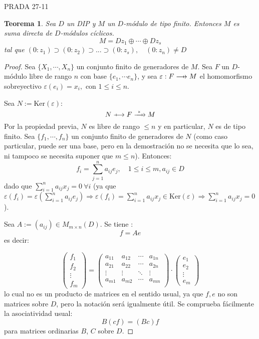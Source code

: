 \documentclass{article}
\def\flechaInyectiva {\mathrel{\ooalign{\thinspace\thinspace$\mapstochar\mkern5mu$\hfil\cr$\longrightarrow$\cr}}}
\def\xFlechaSobreyectiva #1{\mathrel{\ooalign{\hfil$\mapstochar\mkern5mu$\thinspace\thinspace\cr$\xrightarrow{#1}$\cr}}}
\def\flechaSobreyectiva {\mathrel{\ooalign{\hfil$\mapstochar\mkern5mu$\thinspace\thinspace\cr$\longrightarrow$\cr}}}
\theoremstyle{theorem-style}  %
\newtheorem{theorem}{Teorema}[section]  %
\theoremstyle{definition}
\theoremstyle{example-style}
\begin{document}
	PRADA 27-11
	\begin{theorem}
		Sea $ D $ un DIP y $ M $ un $ D $-módulo de tipo finito. Entonces $ M $ es suma directa de $ D$-módulos cíclicos.
		\[ M=Dz_1 \oplus \cdots \oplus Dz_s \]
		tal que $ (0:z_1) \supset (0:z_2) \supset ... \supset (0:z_s), \quad (0:z_n)\neq D $
		
	\end{theorem}
	\begin{proof}
		Sea $ \{X_1,\cdots, X_n\} $ un conjunto finito de generadores de $ M $. Sea $ F $ un $ D $-módulo libre de rango $ n $ con base $ \{e_1, \cdots e_n\} $, y sea $ \varepsilon:F\flechaSobreyectiva M $ el homomorfismo sobreyectivo $ \varepsilon(e_i)=x_i, \text{ con } 1\leq i\leq n $.
		
		Sea $ N:=\text{Ker}(\varepsilon) $:
		\[ N\flechaInyectiva F \xFlechaSobreyectiva{\ \varepsilon \ } M \]
		Por la propiedad previa, $ N $ es libre de rango $ \leq n $ y en particular, $ N $ es de tipo finito. Sea $ \{f_1, \cdots, f_n\} $ un conjunto finito de generadores de $ N $ (como caso particular, puede ser una base, pero en la demostración no se necesita que lo sea, ni tampoco se necesita suponer que $ m\leq n $). Entonces:
		\[ f_i = \sum_{j=1}^{n}a_{ij}e_j, \quad 1\leq i\leq m, a_{ij}\in D \]
		dado que $ \sum_{i=1}^{n} a_{ij}x_j=0 \ \forall i$  (ya que $ \varepsilon(f_i)=\varepsilon(\sum_{i=1}^{n} a_{ij} e_j)\Rightarrow \varepsilon(f_i)=  \sum_{i=1}^{n} a_{ij}x_j \in \text{Ker}(\varepsilon)\Rightarrow \sum_{i=1}^{n} a_{ij}x_j=0$).
		
		Sea $ A:=(a_{ij})\in M_{m \times n}(D) $. Se tiene :
		\[ f=Ae \]
		es decir:
		
		\[ \begin{pmatrix}
			 f_1 \\
			 f_2 \\
			 \vdots \\
			 f_m
		\end{pmatrix} = \begin{pmatrix}
		a_{11} & a_{12} & \cdots & a_{1n} \\
		a_{21} & a_{22} & \cdots & a_{2n} \\
		\vdots & \vdots & \ddots & \vdots \\
		a_{m1} & a_{m2} & \cdots & a_{mn} \\
		\end{pmatrix} \cdot \begin{pmatrix}
		e_1 \\
		e_2 \\
		\vdots \\
		e_m
		\end{pmatrix}\]
		lo cual no es un producto de matrices en el sentido usual, ya que $ f,e $ no son matrices sobre $ D $, pero la notación será igualmente útil. Se comprueba fácilmente la asociatividad usual:
		\[ B(cf)=(Bc)f \]
		para matrices ordinarias $ B $, $ C $ sobre $ D $.
		

\end{proof}
\end{document}
